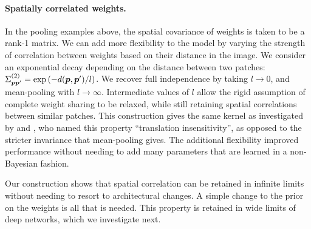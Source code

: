 \documentclass[accepted]{uai2021} %
\newcommand{\priorWcovs}[1]{\Sigma^{(#1)}}
\newcommand{\patch}{\vp}               %
\newcommand{\0}{\boldsymbol{0}}
\newcommand{\1}{\boldsymbol{1}}
\begin{document}

\paragraph{Spatially correlated weights.} In the pooling examples above, the spatial covariance of weights is taken to be a rank-1 matrix. We can add more flexibility to the model by varying the strength of correlation between weights based on their distance in the image. We consider an exponential decay depending on the distance between two patches: $\priorWcovs{2}_{\patch\patch'} = \exp\bra{-d\bra{\patch, \patch'}/l}$. We recover full independence by taking $l\to 0$, and mean-pooling with $l\to\infty$. Intermediate values of $l$ allow the rigid assumption of complete weight sharing to be relaxed, while still retaining spatial correlations between similar patches. This construction gives the same kernel as investigated by \citet{mairal2014ckn} and \citet{dutordoir2020}, who named this property ``translation insensitivity'', as opposed to the stricter invariance that mean-pooling gives. The additional flexibility improved performance without needing to add many parameters that are learned in a non-Bayesian fashion.

Our construction shows that spatial correlation can be retained in infinite limits without needing to resort to architectural changes. A simple change to the prior on the weights is all that is needed. This property is retained in wide limits of deep networks, which we investigate next.


\end{document}

